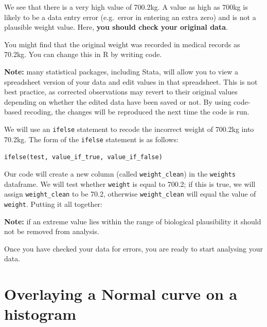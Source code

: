 \documentclass[
]{memoir}
\newenvironment{Shaded}{\begin{snugshade}}{\end{snugshade}}
\newcommand{\FloatTok}[1]{\textcolor[rgb]{0.00,0.00,0.81}{#1}}
\newcommand{\FunctionTok}[1]{\textcolor[rgb]{0.00,0.00,0.00}{#1}}
\newcommand{\NormalTok}[1]{#1}
\newcommand{\OtherTok}[1]{\textcolor[rgb]{0.56,0.35,0.01}{#1}}
\newcommand{\SpecialCharTok}[1]{\textcolor[rgb]{0.00,0.00,0.00}{#1}}
\begin{document}
We see that there is a very high value of 700.2kg. A value as high as 700kg is likely to be a data entry error (e.g.~error in entering an extra zero) and is not a plausible weight value. Here, \textbf{you should check your original data}.

You might find that the original weight was recorded in medical records as 70.2kg. You can change this in R by writing code.

\textbf{Note:} many statistical packages, including Stata, will allow you to view a spreadsheet version of your data and edit values in that spreadsheet. This is not best practice, as corrected observations may revert to their original values depending on whether the edited data have been saved or not. By using code-based recoding, the changes will be reproduced the next time the code is run.

We will use an \texttt{ifelse} statement to recode the incorrect weight of 700.2kg into 70.2kg. The form of the \texttt{ifelse} statement is as follows:

\texttt{ifelse(test,\ value\_if\_true,\ value\_if\_false)}

Our code will create a new column (called \texttt{weight\_clean}) in the \texttt{weights} dataframe. We will test whether \texttt{weight} is equal to 700.2; if this is true, we will assign \texttt{weight\_clean} to be 70.2, otherwise \texttt{weight\_clean} will equal the value of \texttt{weight}. Putting it all together:

\begin{Shaded}
\end{Shaded}

\textbf{Note:} if an extreme value lies within the range of biological plausibility it should not be removed from analysis.

Once you have checked your data for errors, you are ready to start analysing your data.

\hypertarget{overlaying-a-normal-curve-on-a-histogram}{%
\section{Overlaying a Normal curve on a histogram}\label{overlaying-a-normal-curve-on-a-histogram}}
\end{document}
